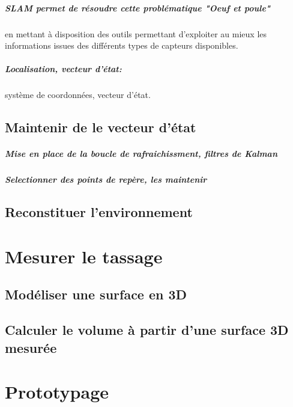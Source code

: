 \documentclass[12pt,a4paper]{report}
\begin{document}
\paragraph{SLAM permet de résoudre cette problématique "Oeuf et poule"} en mettant à disposition des outils permettant d'exploiter au mieux les informations issues des différents types de capteurs disponibles.

\paragraph{Localisation, vecteur d'état: } système de coordonnées, vecteur d'état.


\section{Maintenir de le vecteur d'état}

\paragraph{Mise en place de la boucle de rafraichissment, filtres de Kalman}

\paragraph{Selectionner des points de repère, les maintenir}

\section{Reconstituer l'environnement}


\chapter{Mesurer le tassage}

\section{Modéliser une surface en 3D}

\section{Calculer le volume à partir d'une surface 3D mesurée}


\chapter{Prototypage}
\end{document}
